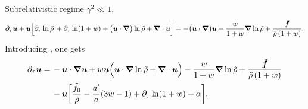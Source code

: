 \documentclass[prd, aps]{article}
\begin{document}
Subrelativistic regime $\gamma^2 \ll 1$,
\begin{align}
    \partial_\tau \uu + \uu \Bigl[ \partial_\tau \ln \tilde \rho \,
    + \partial_\tau \ln (1 + w) + 
    \bigl(\uu \cdot \nab\bigr)
    \ln \tilde \rho + \nab \cdot \uu \Bigr]
    = - \bigl(\uu \cdot \nab \bigr) \uu - \frac{w}{1 + w} \nab \ln \tilde \rho + \frac{\tff}{\tilde \rho\, (1 + w)}.
    \label{mom_1}
\end{align}
Introducing , one gets
\begin{align}
    \partial_\tau \uu = &\, - \uu \cdot \nab \uu  + w \uu
    \Bigl(\uu \cdot \nab \ln \tilde \rho + \nab \cdot \uu
    \Bigr)
     - \frac{w}{1 + w} \nab \ln \tilde \rho + 
     \frac{\tff}{\tilde \rho\, (1 + w)} \nonumber \\
     &\, - \uu \biggl[
    \frac{\tilde f_0}{\tilde \rho} - \frac{a'}{a} (3w - 1) + \partial_\tau \ln (1 + w) + \alpha \biggr].
    \label{mom_2}
\end{align}

\label{RealLastPage}
\end{document}

